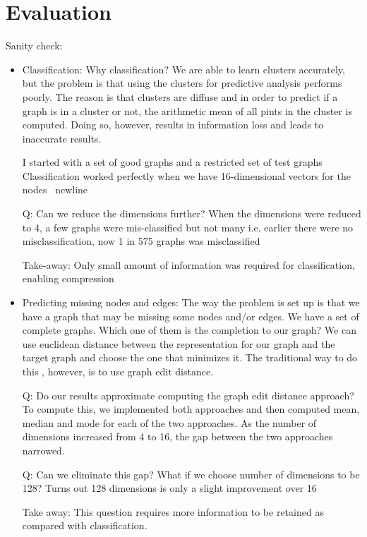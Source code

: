 \section{Evaluation}
Sanity check: \newline
\begin{itemize}
\item Classification: \newline 
Why classification? 
We are able to learn clusters accurately, but the problem is that using the clusters for predictive analysis performs poorly. The reason is that clusters are diffuse and in order to predict if a graph is in a cluster or not, the arithmetic mean of all pints in the cluster is computed. Doing so, however, results in information loss and leads to inaccurate results.

I started with a set of good graphs and a restricted set of test graphs
Classification worked perfectly when we have 16-dimensional vectors for the nodes \ newline

Q: Can we reduce the dimensions further?
When the dimensions were reduced to 4, a few graphs were mis-classified but not many  i.e. earlier there were no misclassification, now 1 in 575 graphs was misclassified

Take-away: Only small amount of information was required for classification, enabling compression

\item Predicting missing nodes and edges:  \newline
The way the problem is set up is that we have a graph that may be missing some nodes and/or edges. We have a set of complete graphs. Which one of them is the completion to our graph?
We can use euclidean distance between the representation for our graph and the target graph and choose the one that minimizes it. The traditional way to do this , however, is to use graph edit distance. 

Q: Do our results approximate computing the graph edit distance approach? 
To compute this, we implemented both approaches and then computed mean, median and mode for each of the two approaches. As the number of dimensions increased from 4 to 16, the gap between the two approaches narrowed. 

Q: Can we eliminate this gap? What if we choose number of dimensions to be 128?
Turns out 128 dimensions is only a slight improvement over 16

Take away: This question requires more information to be retained as compared with classification.
\end{itemize}

